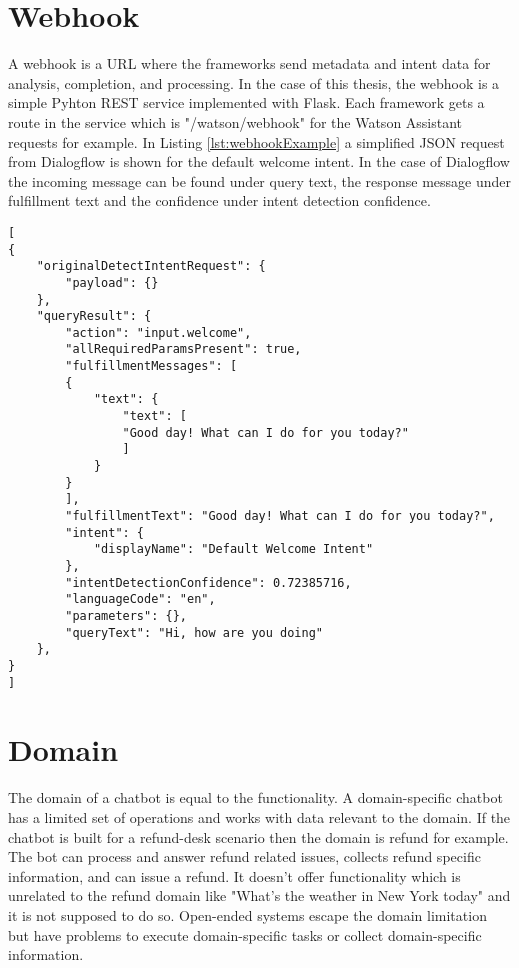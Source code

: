\section{Webhook} \label{sec:webhook}
A webhook is a URL where the frameworks send metadata and intent data for analysis, completion, and processing.
In the case of this thesis, the webhook is a simple Pyhton REST service implemented with Flask.
Each framework gets a route in the service which is "/watson/webhook" for the Watson Assistant requests for example.
In Listing \ref{lst:webhookExample} a simplified JSON request from Dialogflow is shown for the default welcome intent.
In the case of Dialogflow the incoming message can be found under query text, the response message under fulfillment text and the confidence under intent detection confidence. 
\begin{lstlisting}[caption={Dialogflow Webhook Request Example}, label={lst:webhookExample},captionpos=b,frame=single,language={[Sharp]C},commentstyle=\color{mygreen},keywordstyle=\color{blue},
morekeywords={}]                
[
{
    "originalDetectIntentRequest": {
        "payload": {}
    },
    "queryResult": {
        "action": "input.welcome",
        "allRequiredParamsPresent": true,
        "fulfillmentMessages": [
        {
            "text": {
                "text": [
                "Good day! What can I do for you today?"
                ]
            }
        }
        ],
        "fulfillmentText": "Good day! What can I do for you today?",
        "intent": {
            "displayName": "Default Welcome Intent"
        },
        "intentDetectionConfidence": 0.72385716,
        "languageCode": "en",
        "parameters": {},
        "queryText": "Hi, how are you doing"
    },
}
]\end{lstlisting}  


\section{Domain}
The domain of a chatbot is equal to the functionality.
A domain-specific chatbot has a limited set of operations and works with data relevant to the domain.
If the chatbot is built for a refund-desk scenario then the domain is refund for example.
The bot can process and answer refund related issues, collects refund specific information,
and can issue a refund. It doesn't offer functionality which is unrelated to the refund domain like 
"What's the weather in New York today" and it is not supposed to do so.
Open-ended systems escape the domain limitation but have problems to execute domain-specific tasks
or collect domain-specific information. 


